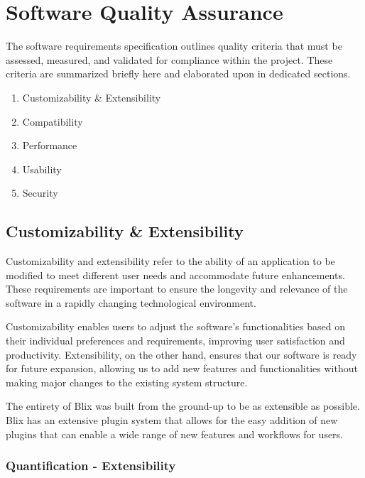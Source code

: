 \documentclass[11pt,a4paper]{article}
\begin{document}
\section*{Software Quality Assurance}

The software requirements specification outlines quality criteria that must be
assessed, measured, and validated for compliance within the project. These
criteria are summarized briefly here and elaborated upon in dedicated sections.


\begin{enumerate}[label*=\arabic*.]
  \item Customizability \& Extensibility
  \item Compatibility
  \item Performance
  \item Usability
  \item Security
\end{enumerate}

\subsection*{Customizability \& Extensibility}

Customizability and extensibility refer to the ability of an application to be
modified to meet different user needs and accommodate future enhancements. These
requirements are important to ensure the longevity and relevance of the software
in a rapidly changing technological environment.

Customizability enables users to adjust the software's functionalities based on
their individual preferences and requirements, improving user satisfaction and
productivity. Extensibility, on the other hand, ensures that our software is
ready for future expansion, allowing us to add new features and functionalities
without making major changes to the existing system structure.

The entirety of Blix was built from the ground-up to be as extensible as
possible. Blix has an extensive plugin system that allows for the easy addition
of new plugins that can enable a wide range of new features and workflows for
users.  

\subsubsection*{Quantification - Extensibility}
\end{document}
